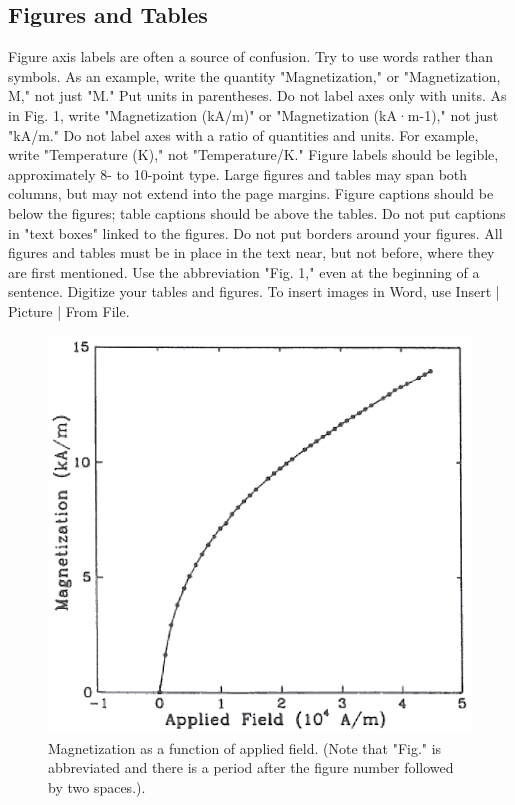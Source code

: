\documentclass[a4paper]{IEEEtran}
\begin{document}
\subsection{Figures and Tables}
Figure axis labels are often a source of confusion. Try to use words rather than symbols. As an example, write the quantity "Magnetization," or "Magnetization, M," not just "M." Put units in parentheses. Do not label axes only with units. As in Fig. 1, write "Magnetization (kA/m)" or "Magnetization (kA·m-1)," not just "kA/m." Do not label axes with a ratio of quantities and units. For example, write "Temperature (K)," not "Temperature/K." Figure labels should be legible, approximately 8- to 10-point type.
Large figures and tables may span both columns, but may not extend into the page margins. Figure captions should be below the figures; table captions should be above the tables. Do not put captions in "text boxes" linked to the figures. Do not put borders around your figures.
All figures and tables must be in place in the text near, but not before, where they are first mentioned. Use the abbreviation "Fig. 1," even at the beginning of a sentence.
Digitize your tables and figures. To insert images in Word, use Insert | Picture | From File.

\begin{figure}[H]
\begin{centering}
\includegraphics[scale=1]{img}
\par\end{centering}

\caption{Magnetization as a function of applied field. (Note that "Fig." is abbreviated and there is a period after the figure number followed by two spaces.).\label{img}}

\end{figure}
\end{document}
